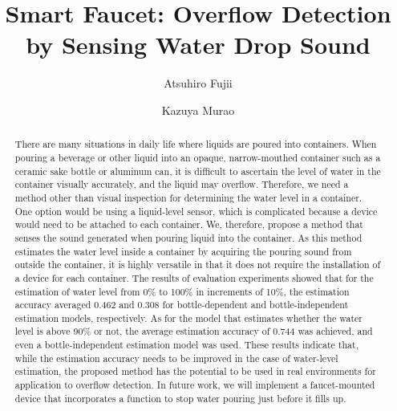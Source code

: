 \documentclass[sigconf,authordraft]{acmart}
\begin{document}
\title{Smart Faucet: Overflow Detection by Sensing Water Drop Sound}

\author{Atsuhiro Fujii}

\author{Kazuya Murao}

\renewcommand{\shortauthors}{Fujii and Murao}

\begin{abstract}
  There are many situations in daily life where liquids are poured into containers. When pouring a beverage or other liquid into an opaque, narrow-mouthed container such as a ceramic sake bottle or aluminum can, it is difficult to ascertain the level of water in the container visually accurately, and the liquid may overflow. Therefore, we need a method other than visual inspection for determining the water level in a container. One option would be using a liquid-level sensor, which is complicated because a device would need to be attached to each container. We, therefore, propose a method that senses the sound generated when pouring liquid into the container. As this method estimates the water level inside a container by acquiring the pouring sound from outside the container, it is highly versatile in that it does not require the installation of a device for each container. The results of evaluation experiments showed that for the estimation of water level from 0\% to 100\% in increments of 10\%, the estimation accuracy averaged 0.462 and 0.308 for bottle-dependent and bottle-independent estimation models, respectively. As for the model that estimates whether the water level is above 90\% or not, the average estimation accuracy of 0.744 was achieved, and even a bottle-independent estimation model was used. These results indicate that, while the estimation accuracy needs to be improved in the case of water-level estimation, the proposed method has the potential to be used in real environments for application to overflow detection. In future work, we will implement a faucet-mounted device that incorporates a function to stop water pouring just before it fills up.
\end{abstract}
\end{document}
